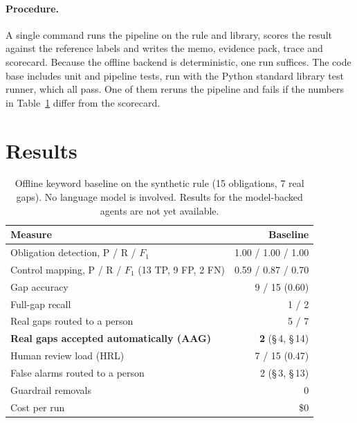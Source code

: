 \documentclass[sigconf,review,anonymous]{acmart}
\begin{document}
\paragraph{Procedure.}
A single command runs the pipeline on the rule and library, scores the
result against the reference labels and writes the memo, evidence pack,
trace and scorecard. Because the offline backend is deterministic, one run
suffices. The code base includes unit and pipeline tests, run with the
Python standard library test runner, which all pass. One of them reruns the
pipeline and fails if the numbers in Table~\ref{tab:results} differ from the
scorecard.

\section{Results}
\label{sec:results}

\begin{table}[t]
  \caption{Offline keyword baseline on the synthetic rule (15 obligations,
  7 real gaps). No language model is involved. Results for the
  model-backed agents are not yet available.}
  \label{tab:results}
  \small
  \begin{tabular}{@{}lr@{}}
    \toprule
    Measure & Baseline \\
    \midrule
    Obligation detection, P / R / $F_1$ & 1.00 / 1.00 / 1.00 \\
    Control mapping, P / R / $F_1$ (13 TP, 9 FP, 2 FN) & 0.59 / 0.87 / 0.70 \\
    Gap accuracy & 9 / 15 (0.60) \\
    Full-gap recall & 1 / 2 \\
    Real gaps routed to a person & 5 / 7 \\
    \textbf{Real gaps accepted automatically (AAG)} & \textbf{2} (\S\,4, \S\,14) \\
    Human review load (HRL) & 7 / 15 (0.47) \\
    False alarms routed to a person & 2 (\S\,3, \S\,13) \\
    Guardrail removals & 0 \\
    Cost per run & \$0 \\
    \bottomrule
  \end{tabular}
\end{table}
\end{document}
